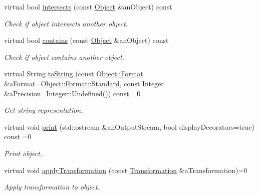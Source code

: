 \begin{DoxyCompactItemize}
virtual bool \hyperlink{classlibrary_1_1math_1_1geom_1_1d2_1_1_object_a22819b510e52283c19c4ed947e0cba97}{intersects} (const \hyperlink{classlibrary_1_1math_1_1geom_1_1d2_1_1_object}{Object} \&an\+Object) const
\begin{DoxyCompactList}\small\item\em Check if object intersects another object. \end{DoxyCompactList}\item 
virtual bool \hyperlink{classlibrary_1_1math_1_1geom_1_1d2_1_1_object_a7bc14e621db51aec72eff0fa5da295ac}{contains} (const \hyperlink{classlibrary_1_1math_1_1geom_1_1d2_1_1_object}{Object} \&an\+Object) const
\begin{DoxyCompactList}\small\item\em Check if object contains another object. \end{DoxyCompactList}\item 
virtual String \hyperlink{classlibrary_1_1math_1_1geom_1_1d2_1_1_object_acdd76b3637732a249536b609dbe3f0eb}{to\+String} (const \hyperlink{classlibrary_1_1math_1_1geom_1_1d2_1_1_object_ac8cd61dada4960cfee9a469231621b17}{Object\+::\+Format} \&a\+Format=\hyperlink{classlibrary_1_1math_1_1geom_1_1d2_1_1_object_ac8cd61dada4960cfee9a469231621b17aeb6d8ae6f20283755b339c0dc273988b}{Object\+::\+Format\+::\+Standard}, const Integer \&a\+Precision=Integer\+::\+Undefined()) const =0
\begin{DoxyCompactList}\small\item\em Get string representation. \end{DoxyCompactList}\item 
virtual void \hyperlink{classlibrary_1_1math_1_1geom_1_1d2_1_1_object_a834bbf59cf1c483d1dc7b0966b1e1ab3}{print} (std\+::ostream \&an\+Output\+Stream, bool display\+Decorators=true) const =0
\begin{DoxyCompactList}\small\item\em Print object. \end{DoxyCompactList}\item 
virtual void \hyperlink{classlibrary_1_1math_1_1geom_1_1d2_1_1_object_a289589fb6e9e7a2c4ca4976a1544def5}{apply\+Transformation} (const \hyperlink{classlibrary_1_1math_1_1geom_1_1d2_1_1_transformation}{Transformation} \&a\+Transformation)=0
\begin{DoxyCompactList}\small\item\em Apply transformation to object. \end{DoxyCompactList}\end{DoxyCompactItemize}
